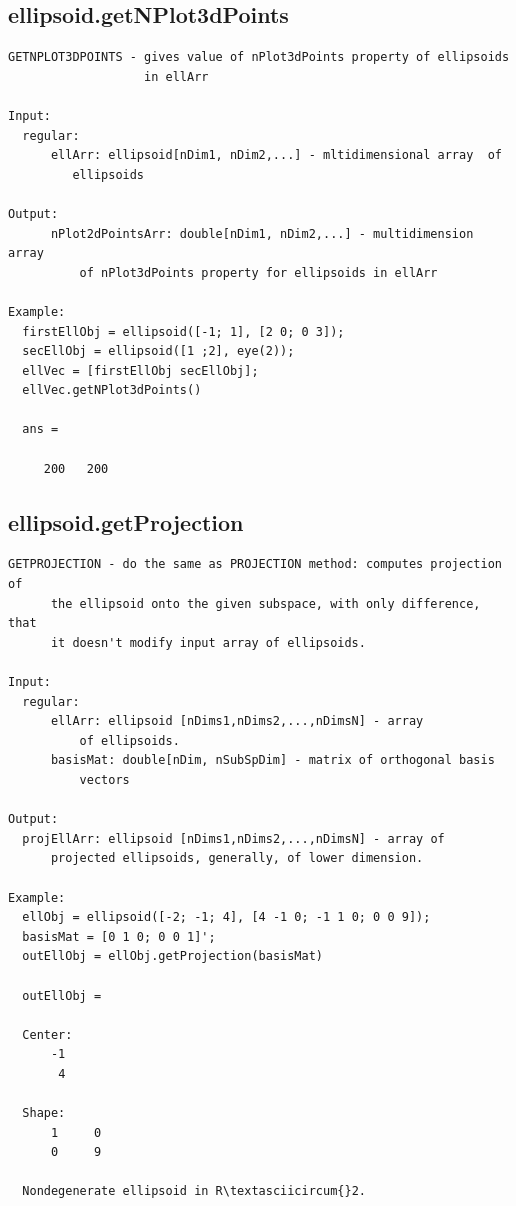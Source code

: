 \documentclass[letterpaper,10pt,english]{sphinxmanual}
\begin{document}
\subsection{ellipsoid.getNPlot3dPoints}
\label{chap_functions:ellipsoid-getnplot3dpoints}
\begin{Verbatim}[commandchars=\\\{\}]
GETNPLOT3DPOINTS - gives value of nPlot3dPoints property of ellipsoids
                   in ellArr

Input:
  regular:
      ellArr: ellipsoid[nDim1, nDim2,...] - mltidimensional array  of
         ellipsoids

Output:
      nPlot2dPointsArr: double[nDim1, nDim2,...] - multidimension array
          of nPlot3dPoints property for ellipsoids in ellArr

Example:
  firstEllObj = ellipsoid([-1; 1], [2 0; 0 3]);
  secEllObj = ellipsoid([1 ;2], eye(2));
  ellVec = [firstEllObj secEllObj];
  ellVec.getNPlot3dPoints()

  ans =

     200   200
\end{Verbatim}


\subsection{ellipsoid.getProjection}
\label{chap_functions:ellipsoid-getprojection}
\begin{Verbatim}[commandchars=\\\{\}]
GETPROJECTION - do the same as PROJECTION method: computes projection of
      the ellipsoid onto the given subspace, with only difference, that
      it doesn't modify input array of ellipsoids.

Input:
  regular:
      ellArr: ellipsoid [nDims1,nDims2,...,nDimsN] - array
          of ellipsoids.
      basisMat: double[nDim, nSubSpDim] - matrix of orthogonal basis
          vectors

Output:
  projEllArr: ellipsoid [nDims1,nDims2,...,nDimsN] - array of
      projected ellipsoids, generally, of lower dimension.

Example:
  ellObj = ellipsoid([-2; -1; 4], [4 -1 0; -1 1 0; 0 0 9]);
  basisMat = [0 1 0; 0 0 1]';
  outEllObj = ellObj.getProjection(basisMat)

  outEllObj =

  Center:
      -1
       4

  Shape:
      1     0
      0     9

  Nondegenerate ellipsoid in R\textasciicircum{}2.
\end{Verbatim}
\end{document}
